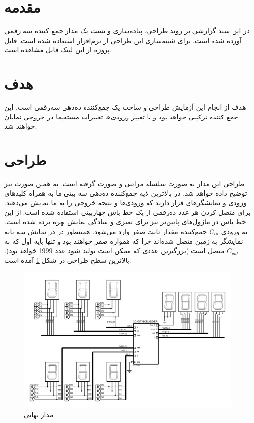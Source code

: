 \documentclass{article}
\begin{document}
\section{مقدمه}
در این سند گزارشی بر روند طراحی، پیاده‌سازی و تست یک مدار جمع کننده  سه رقمی آورده ‌شده است. برای شبیه‌سازی این طراحی از نرم‌افزار  استفاده شده است. فایل پروژه از این لینک قابل مشاهده است.

\section{هدف}
هدف از انجام این آزمایش طراحی و ساخت یک جمع‌کننده ده‌دهی سه‌رقمی است. این جمع کننده ترکیبی خواهد بود و با تغییر ورودی‌ها تغییرات مستقیما در خروجی نمایان خواهند شد.

\section{طراحی}
طراحی این مدار به صورت سلسله مراتبی و  صورت گرفته است. به همین‌ صورت نیز توضیح داده خواهد شد. در بالاترین لایه جمع‌کننده ده‌دهی سه بیتی ما به همراه کلید‌های ورودی و نمایشگر‌های  قرار دارند که ورودی‌ها و نتیجه خروجی‌ را به ما نمایش می‌دهند. برای متصل کردن هر عدد ده‌رقمی از یک خط باس چهاربیتی استفاده شده است. از این خط باس در ماژول‌های پایین‌تر نیز برای تمیزی و سادگی نمایش بهره‌ برده شده است.
به ورودی
$ C_{in} $
 جمع‌کننده مقدار ثابت صفر وارد می‌شود. همینطور در در نمایش سه پایه نمایشگر به زمین متصل شده‌اند چرا که همواره صفر خواهند بود و تنها پایه اول که به
$C_{out}$
  متصل است (بزرگترین عددی که ممکن است تولید شود عدد 1999 خواهد بود). بالاترین سطح طراحی در شکل \ref{fig:final} آمده است.

\begin{figure}
	\centering
	\includegraphics[scale=0.5]{./captures/final}
	\caption{مدار نهایی}
	\label{fig:final}
\end{figure}
\end{document}
